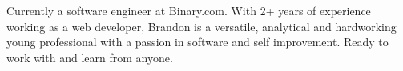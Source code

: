 

\begin{cvparagraph}

Currently a software engineer at Binary.com. With 2+ years of experience working as a web developer, Brandon is a versatile, analytical and hardworking young professional with a passion in software and self improvement. Ready to work with and learn from anyone.
\end{cvparagraph}
